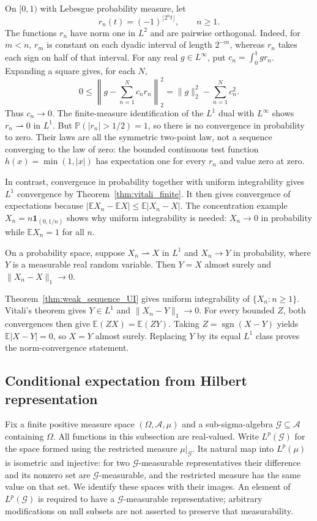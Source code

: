 \begin{example}
On $[0,1)$ with Lebesgue probability measure, let
\[
r_n(t)=(-1)^{\lfloor2^nt\rfloor},\qquad n\geqslant1.
\]
The functions $r_n$ have norm one in $L^2$ and are pairwise orthogonal.
Indeed, for $m<n$, $r_m$ is constant on each dyadic interval of length
$2^{-m}$, whereas $r_n$ takes each sign on half of that interval.
For any real $g\in L^\infty$, put $c_n=\int_0^1gr_n$.
Expanding a square gives, for each $N$,
\[
0\leqslant\left\|g-\sum_{n=1}^Nc_nr_n\right\|_2^2
=\|g\|_2^2-\sum_{n=1}^Nc_n^2.
\]
Thus $c_n\to0$. The finite-measure identification of the $L^1$ dual
with $L^\infty$ shows $r_n\rightharpoonup0$ in $L^1$.
But $\mathbb{P}(|r_n|>1/2)=1$, so there is no convergence in
probability to zero. Their laws are all the symmetric two-point law,
not a sequence converging to the law of zero: the bounded continuous
test function $h(x)=\min(1,|x|)$ has expectation one for every $r_n$
and value zero at zero.
\end{example}

In contrast, convergence in probability together with uniform
integrability gives $L^1$ convergence by
Theorem~\ref{thm:vitali_finite}. It then gives convergence of
expectations because
$|\mathbb{E}X_n-\mathbb{E}X|\leqslant\mathbb{E}|X_n-X|$.
The concentration example $X_n=n\mathbf{1}_{(0,1/n)}$ shows why
uniform integrability is needed: $X_n\to0$ in probability while
$\mathbb{E}X_n=1$ for all $n$.

\begin{corollary}
On a probability space, suppose $X_n\rightharpoonup X$ in $L^1$ and
$X_n\to Y$ in probability, where $Y$ is a measurable real random
variable. Then $Y=X$ almost surely and $\|X_n-X\|_1\to0$.
\end{corollary}
\Proof
Theorem~\ref{thm:weak_sequence_UI} gives uniform integrability of
$\{X_n:n\geq1\}$. Vitali's theorem gives $Y\in L^1$ and
$\|X_n-Y\|_1\to0$. For every bounded $Z$, both convergences then give
$\mathbb E(ZX)=\mathbb E(ZY)$. Taking $Z=\operatorname{sgn}(X-Y)$
yields $\mathbb E|X-Y|=0$, so $X=Y$ almost surely. Replacing $Y$ by
its equal $L^1$ class proves the norm-convergence statement.
\Done

\subsection{Conditional expectation from Hilbert representation}
Fix a finite positive measure space $(\Omega,\mathcal A,\mu)$ and a
sub-sigma-algebra $\mathcal G\subseteq\mathcal A$ containing $\Omega$.
All functions in this subsection are real-valued. Write $L^p(\mathcal G)$
for the space formed using the restricted measure $\mu|_{\mathcal G}$.
Its natural map into $L^p(\mu)$ is isometric and injective: for two
$\mathcal G$-measurable representatives their difference and its
nonzero set are $\mathcal G$-measurable, and the restricted measure
has the same value on that set. We identify these spaces with their
images. An element of $L^p(\mathcal G)$ is required to have a
$\mathcal G$-measurable representative; arbitrary modifications on
null subsets are not asserted to preserve that measurability.

